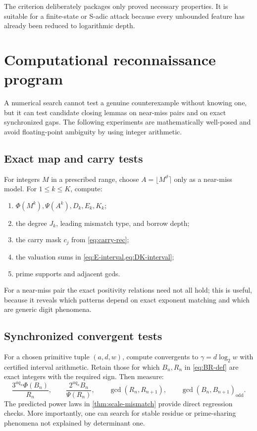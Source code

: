 \documentclass[11pt]{article}
\theoremstyle{definition}
\begin{document}
The criterion deliberately packages only proved necessary properties.  It
is suitable for a finite-state or S-adic attack because every unbounded
feature has already been reduced to logarithmic depth.

\section{Computational reconnaissance program}
\label{sec:computation}

A numerical search cannot test a genuine counterexample without knowing one,
but it can test candidate closing lemmas on near-miss pairs and on exact
synchronized gaps.  The following experiments are mathematically
well-posed and avoid floating-point ambiguity by using integer arithmetic.

\subsection{Exact map and carry tests}

For integers \(M\) in a prescribed range, choose
\(A=\lfloor M^\vartheta\rceil\) only as a near-miss model.  For
\(1\le k\le K\), compute:
\begin{enumerate}
\item \(\Phi(M^k),\Psi(A^k),D_k,E_k,K_k\);
\item the degree \(J_k\), leading mismatch type, and borrow depth;
\item the carry mask \(c_j\) from \cref{eq:carry-rec};
\item the valuation sums in \cref{eq:E-interval,eq:DK-interval};
\item prime supports and adjacent gcds.
\end{enumerate}
For a near-miss pair the exact positivity relations need not all hold; this
is useful, because it reveals which patterns depend on exact exponent
matching and which are generic digit phenomena.

\subsection{Synchronized convergent tests}

For a chosen primitive tuple \((a,d,w)\), compute convergents to
\(\gamma=d\log_2w\) with certified interval arithmetic.  Retain those for
which \(B_n,R_n\) in \cref{eq:BR-def} are exact integers with the required
sign.  Then measure:
\begin{equation}\label{eq:computational-ratios}
 \frac{3^{aq_n}\Phi(B_n)}{R_n},
 \qquad
 \frac{2^{aq_n}B_n}{\Psi(R_n)},
 \qquad
 \gcd(R_n,R_{n+1}),
 \qquad
 \gcd(B_n,B_{n+1})_{\mathrm{odd}}.
\end{equation}
The predicted power laws in \cref{thm:scale-mismatch} provide direct
regression checks.  More importantly, one can search for stable residue or
prime-sharing phenomena not explained by determinant one.
\end{document}
